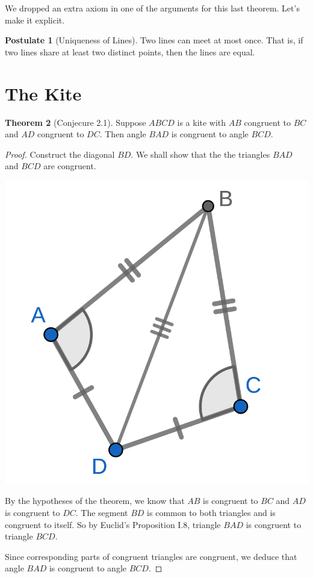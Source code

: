 \documentclass{tufte-handout}
\theoremstyle{definition}
\newtheorem{theorem}{Theorem}[section]
\newtheorem{postulate}[theorem]{Postulate}
\begin{document}
We dropped an extra axiom in one of the arguments for this last theorem. Let's make it explicit.

\begin{postulate}[Uniqueness of Lines]
Two lines can meet at most once. That is, if two lines share at least two distinct points, then the lines are equal.
\end{postulate}




\clearpage


\setcounter{section}{2}
\setcounter{theorem}{0}
\section{The Kite}\label{section:kites}


\begin{theorem}[Conjecure 2.1]\label{theorem:kites-1}
Suppose $ABCD$ is a kite with $AB$ congruent to $BC$ and $AD$ congruent to $DC$. Then angle $BAD$ is congruent to angle $BCD$.
\end{theorem}

\begin{proof}
Construct the diagonal $BD$. We shall show that the the triangles $BAD$ and $BCD$ are congruent.

\begin{marginfigure}
  \includegraphics{images/kite_symmetry.png}
\end{marginfigure}


By the hypotheses of the theorem, we know that $AB$ is congruent to $BC$ and $AD$ is congruent to $DC$. The segment
$BD$ is common to both triangles and is congruent to itself. So by Euclid's Proposition I.8, triangle $BAD$ is congruent to triangle $BCD$.

Since corresponding parts of congruent triangles are congruent, we deduce that angle $BAD$ is congruent to angle $BCD$.
\end{proof}
\end{document}

